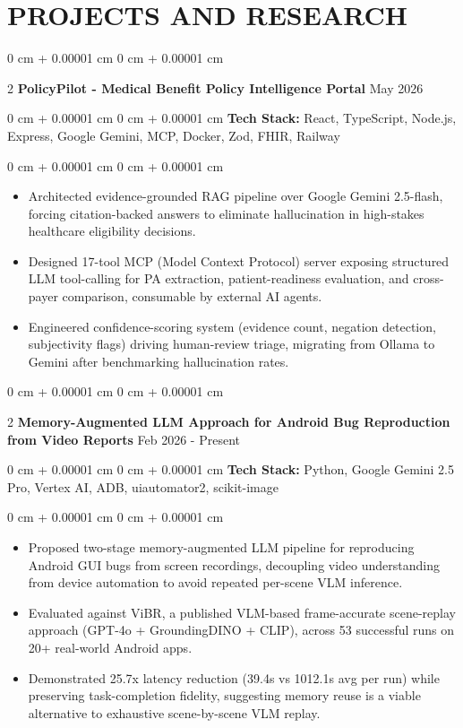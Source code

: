 \documentclass[9pt, letterpaper]{article}
\newenvironment{highlights}{
    \begin{itemize}[
        topsep=0.05 cm,
        parsep=0 pt,
        partopsep=0pt,
        itemsep=0pt,
        leftmargin=10pt
    ]
}{
    \end{itemize}
} %
\newenvironment{onecolentry}{
    \begin{adjustwidth}{
        0 cm + 0.00001 cm}{
        0 cm + 0.00001 cm}
}{
    \end{adjustwidth}
} %
\newenvironment{twocolentry}[2][]{
    \onecolentry
    \def\secondColumn{#2}
    \setcolumnwidth{\fill, 4.5 cm}
    \begin{paracol}{2}
}{
    \switchcolumn \raggedleft \secondColumn
    \end{paracol}
    \endonecolentry
} %
\begin{document}
\section{PROJECTS AND RESEARCH}

    \begin{twocolentry}
        {May 2026}\textbf{PolicyPilot - Medical Benefit Policy Intelligence Portal}    \end{twocolentry}
    \begin{onecolentry}\textbf{Tech Stack:} React, TypeScript, Node.js, Express, Google Gemini, MCP, Docker, Zod, FHIR, Railway \end{onecolentry}
    \begin{onecolentry}
        \begin{highlights}
            \item Architected evidence-grounded RAG pipeline over Google Gemini 2.5-flash, forcing citation-backed answers to eliminate hallucination in high-stakes healthcare eligibility decisions.
            \item Designed 17-tool MCP (Model Context Protocol) server exposing structured LLM tool-calling for PA extraction, patient-readiness evaluation, and cross-payer comparison, consumable by external AI agents.
            \item Engineered confidence-scoring system (evidence count, negation detection, subjectivity flags) driving human-review triage, migrating from Ollama to Gemini after benchmarking hallucination rates.
        \end{highlights}
    \end{onecolentry}
    \vspace{0.04 cm}

    \begin{twocolentry}
        {Feb 2026 - Present}\textbf{Memory-Augmented LLM Approach for Android Bug Reproduction from Video Reports}    \end{twocolentry}
    \begin{onecolentry}\textbf{Tech Stack:} Python, Google Gemini 2.5 Pro, Vertex AI, ADB, uiautomator2, scikit-image \end{onecolentry}
    \begin{onecolentry}
        \begin{highlights}
            \item Proposed two-stage memory-augmented LLM pipeline for reproducing Android GUI bugs from screen recordings, decoupling video understanding from device automation to avoid repeated per-scene VLM inference.
            \item Evaluated against ViBR, a published VLM-based frame-accurate scene-replay approach (GPT-4o + GroundingDINO + CLIP), across 53 successful runs on 20+ real-world Android apps.
            \item Demonstrated 25.7x latency reduction (39.4s vs 1012.1s avg per run) while preserving task-completion fidelity, suggesting memory reuse is a viable alternative to exhaustive scene-by-scene VLM replay.
        \end{highlights}
    \end{onecolentry}
\end{document}
